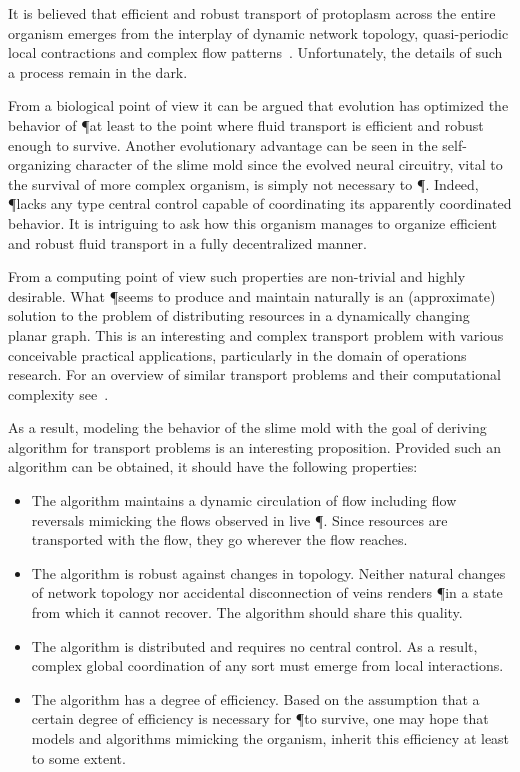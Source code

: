   It is believed that efficient and robust transport of protoplasm across the entire organism emerges from the interplay of dynamic network topology, quasi-periodic local contractions and complex flow patterns~\cite{alim2013random,teplov1991continuum}. Unfortunately, the details of such a process remain in the dark.

  From a biological point of view it can be argued that evolution has optimized the behavior of \P at least to the point where fluid transport is efficient and robust enough to survive. Another evolutionary advantage can be seen in the self-organizing character of the slime mold since the evolved neural circuitry, vital to the survival of more complex organism, is simply not necessary to \P. Indeed, \P lacks any type central control capable of coordinating its apparently coordinated behavior. It is intriguing to ask how this organism manages to organize efficient and robust fluid transport in a fully decentralized manner.

  From a computing point of view such properties are non-trivial and highly desirable. What \P seems to produce and maintain naturally is an (approximate) solution to the problem of distributing resources in a dynamically changing planar graph. This is an interesting and complex transport problem with various conceivable practical applications, particularly in the domain of operations research. For an overview of similar transport problems and their computational complexity see~\cite{Ausiello:1999:CAC:554706,4567876,Hillier:1986:IOR:27036}.

  As a result, modeling the behavior of the slime mold with the goal of deriving algorithm for transport problems is an interesting proposition. Provided such an algorithm can be obtained, it should have the following properties:

  \begin{itemize}
  \item The algorithm maintains a dynamic circulation of flow including flow reversals mimicking the flows observed in live \P. Since resources are transported with the flow, they go wherever the flow reaches.
  \item The algorithm is robust against changes in topology. Neither natural changes of network topology nor accidental disconnection of veins renders \P in a state from which it cannot recover. The algorithm should share this quality.
  \item The algorithm is distributed and requires no central control. As a result, complex global coordination of any sort must emerge from local interactions.
  \item The algorithm has a degree of efficiency. Based on the assumption that a certain degree of efficiency is necessary for \P to survive, one may hope that models and algorithms mimicking the organism, inherit this efficiency at least to some extent.
  \end{itemize}


